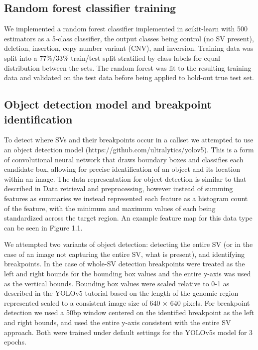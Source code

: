 \subsection{Random forest classifier training}

We implemented a random forest classifier \cite{ho1995random} implemented in scikit-learn \cite{scikit-learn} with 500 estimators as a 5-class classifier, the output classes being control (no SV present), deletion, insertion, copy number variant (CNV), and inversion. Training data was split into a 77\%/33\% train/test split stratified by class labels for equal distribution between the sets. The random forest was fit to the resulting training data and validated on the test data before being applied to hold-out true test set.

\subsection{Object detection model and breakpoint identification}

To detect where SVs and their breakpoints occur in a callset we attempted to use an object detection model (https://github.com/ultralytics/yolov5). This is a form of convolutional neural network that draws boundary boxes and classifies each candidate box, allowing for precise identification of an object and its location within an image. The data representation for object detection is similar to that described in Data retrieval and preprocessing, however instead of summing features as summaries we instead represented each feature as a histogram count of the feature, with the minimum and maximum values of each being standardized across the target region. An example feature map for this data type can be seen in Figure 1.1. 

We attempted two variants of object detection: detecting the entire SV (or in the case of an image not capturing the entire SV, what is present), and identifying breakpoints. In the case of whole-SV detection breakpoints were treated as the left and right bounds for the bounding box values and the entire y-axis was used as the vertical bounds. Bounding box values were scaled relative to 0-1 as described in the YOLOv5 tutorial based on the length of the genomic region represented scaled to a consistent image size of 640 $\times$ 640 pixels. For breakpoint detection we used a 50bp window centered on the identified breakpoint as the left and right bounds, and used the entire y-axis consistent with the entire SV approach. Both were trained under default settings for the YOLOv5s model for 3 epochs.

